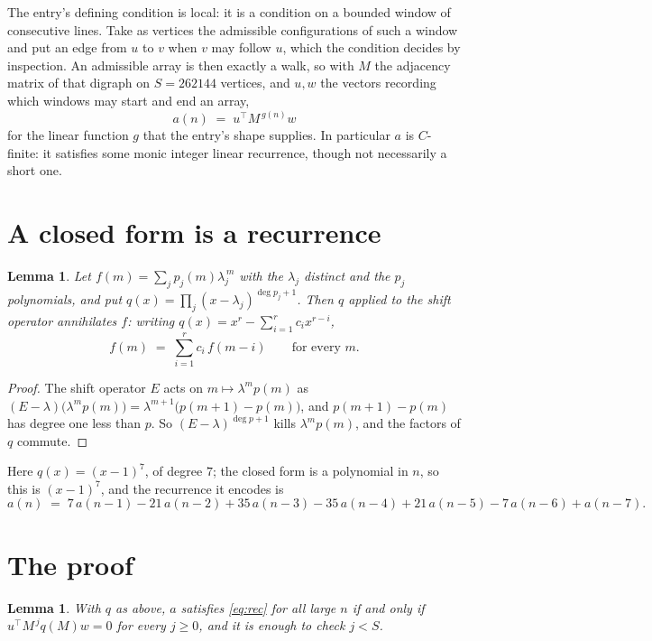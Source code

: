 \documentclass[11pt,a4paper]{article}
\theoremstyle{plain}
\newtheorem{lemma}[theorem]{Lemma}
\theoremstyle{definition}
\begin{document}
The entry's defining condition is local: it is a condition on a bounded window of consecutive lines. Take as vertices the
admissible configurations of such a window and put an edge from $u$ to $v$ when $v$ may
follow $u$, which the condition decides by inspection. An admissible array is then exactly a
walk, so with $M$ the adjacency matrix of that digraph on $S=262144$ vertices, and $u,w$ the
vectors recording which windows may start and end an array,
\[
a(n)\;=\;u^{\!\top}M^{\,g(n)}w
\]
for the linear function $g$ that the entry's shape supplies. In particular $a$ is
$C$-finite: it satisfies some monic integer linear recurrence, though not necessarily a short
one.

\section{A closed form is a recurrence}

\begin{lemma}\label{lem:ann}
Let $f(m)=\sum_{j}p_j(m)\lambda_j^{\,m}$ with the $\lambda_j$ distinct and the $p_j$
polynomials, and put $q(x)=\prod_j(x-\lambda_j)^{\deg p_j+1}$. Then $q$ applied to the shift
operator annihilates $f$: writing $q(x)=x^{r}-\sum_{i=1}^{r}c_ix^{r-i}$,
\[
f(m)\;=\;\sum_{i=1}^{r}c_i\,f(m-i)\qquad\text{for every }m.
\]
\end{lemma}

\begin{proof}
The shift operator $E$ acts on $m\mapsto\lambda^{m}p(m)$ as
$(E-\lambda)\bigl(\lambda^{m}p(m)\bigr)=\lambda^{m+1}\bigl(p(m+1)-p(m)\bigr)$, and
$p(m+1)-p(m)$ has degree one less than $p$. So $(E-\lambda)^{\deg p+1}$ kills
$\lambda^{m}p(m)$, and the factors of $q$ commute.
\end{proof}

Here $q(x)=(x-1)^{7}$, of degree $7$; the closed form is a polynomial in $n$, so this is $(x-1)^{7}$, and the recurrence it encodes is
\begin{equation}\label{eq:rec}
a(n)\;=\;7\,a(n-1) - 21\,a(n-2) + 35\,a(n-3) - 35\,a(n-4) + 21\,a(n-5) - 7\,a(n-6) + a(n-7).
\end{equation}

\section{The proof}

\begin{lemma}\label{lem:crit}
With $q$ as above, $a$ satisfies \eqref{eq:rec} for all large $n$ if and only if
$u^{\!\top}M^{\,j}q(M)w=0$ for every $j\ge0$, and it is enough to check $j<S$.
\end{lemma}
\end{document}
